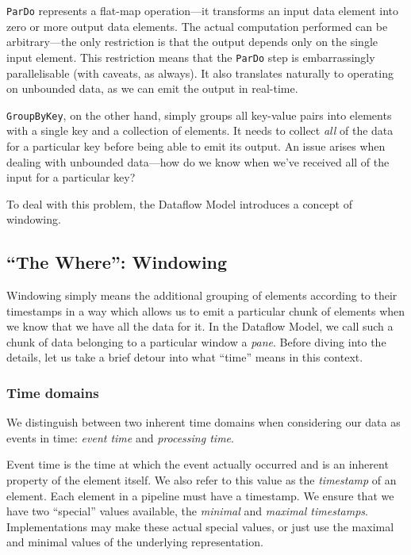 \verb|ParDo| represents a flat-map operation---it transforms an input data element into zero or more output data elements.
The actual computation performed can be arbitrary---the only restriction is that the output depends only on the single input element.
This restriction means that the \verb|ParDo| step is embarrassingly parallelisable (with caveats, as always).
It also translates naturally to operating on unbounded data, as we can emit the output in real-time.

\verb|GroupByKey|, on the other hand, simply groups all key-value pairs into elements with a single key and a collection of elements.
It needs to collect \emph{all} of the data for a particular key before being able to emit its output.
An issue arises when dealing with unbounded data---how do we know when we've received all of the input for a particular key?

To deal with this problem, the Dataflow Model introduces a concept of windowing.

\subsection{``The Where'': Windowing}\label{sec:prep:dataflow:where}

Windowing simply means the additional grouping of elements according to their timestamps in a way which allows us to emit a particular chunk of elements when we know that we have all the data for it.
In the Dataflow Model, we call such a chunk of data belonging to a particular window a \emph{pane}.
Before diving into the details, let us take a brief detour into what ``time'' means in this context.

\subsubsection{Time domains}
We distinguish between two inherent time domains when considering our data as events in time: \emph{event time} and \emph{processing time}.

Event time is the time at which the event actually occurred and is an inherent property of the element itself.
We also refer to this value as the \emph{timestamp} of an element.
Each element in a pipeline must have a timestamp.
We ensure that we have two ``special'' values available, the \emph{minimal} and \emph{maximal timestamps}.
Implementations may make these actual special values, or just use the maximal and minimal values of the underlying representation.

